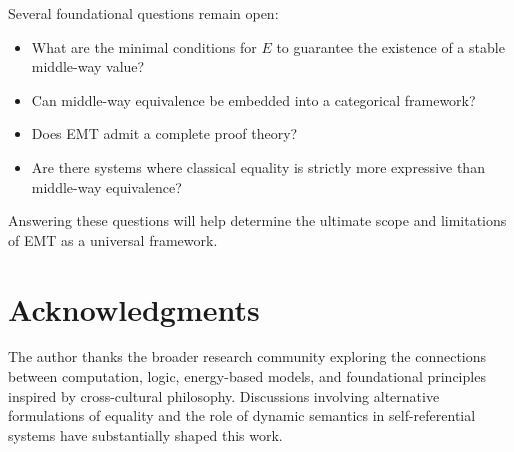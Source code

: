 \documentclass[11pt]{article}
\theoremstyle{definition}
\theoremstyle{remark}
\begin{document}
Several foundational questions remain open:

\begin{itemize}
  \item What are the minimal conditions for $E$ to guarantee the
        existence of a stable middle-way value?
  \item Can middle-way equivalence be embedded into a categorical
        framework?
  \item Does EMT admit a complete proof theory?
  \item Are there systems where classical equality is strictly more
        expressive than middle-way equivalence?
\end{itemize}

Answering these questions will help determine the ultimate scope and
limitations of EMT as a universal framework.


\section*{Acknowledgments}

The author thanks the broader research community exploring the
connections between computation, logic, energy-based models, and
foundational principles inspired by cross-cultural philosophy.
Discussions involving alternative formulations of equality and the
role of dynamic semantics in self-referential systems have
substantially shaped this work.

\end{document}
